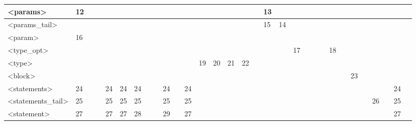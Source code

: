 \begin{tabular}{|l|l|l|l|l|l|l|l|l|l|l|l|l|l|l|l|l|l|l|l|l|l|l|l|l|l|l|l|l|l|l|}
\rowcolor[HTML]{EEEEEE} 
\textless{}params\textgreater{}           & 12 &        &     &     &     &    &      &      &       &    &        &     &        &        &      &   & 13 &    &    &    &   &   &    &   &         &        &        &     &      &    \\ \hline
\textless{}params\_tail\textgreater{}     &    &        &     &     &     &    &      &      &       &    &        &     &        &        &      &   & 15 & 14 &    &    &   &   &    &   &         &        &        &     &      &    \\ \hline
\rowcolor[HTML]{EEEEEE} 
\textless{}param\textgreater{}            & 16 &        &     &     &     &    &      &      &       &    &        &     &        &        &      &   &    &    &    &    &   &   &    &   &         &        &        &     &      &    \\ \hline
\textless{}type\_opt\textgreater{}        &    &        &     &     &     &    &      &      &       &    &        &     &        &        &      &   &    &    & 17 &    &   &   & 18 &   &         &        &        &     &      &    \\ \hline
\rowcolor[HTML]{EEEEEE} 
\textless{}type\textgreater{}             &    &        &     &     &     &    &      &      &       &    &        & 19  & 20     & 21     & 22   &   &    &    &    &    &   &   &    &   &         &        &        &     &      &    \\ \hline
\textless{}block\textgreater{}            &    &        &     &     &     &    &      &      &       &    &        &     &        &        &      &   &    &    &    &    &   &   &    &   & 23      &        &        &     &      &    \\ \hline
\rowcolor[HTML]{EEEEEE} 
\textless{}statements\textgreater{}       & 24 &        &     & 24  & 24  & 24 &      &      & 24    &    & 24     &     &        &        &      &   &    &    &    &    &   &   &    &   &         &        &        &     & 24   &    \\ \hline
\textless{}statements\_tail\textgreater{} & 25 &        &     & 25  & 25  & 25 &      &      & 25    &    & 25     &     &        &        &      &   &    &    &    &    &   &   &    &   &         &        & 26     &     & 25   &    \\ \hline
\rowcolor[HTML]{EEEEEE} 
\textless{}statement\textgreater{}        & 27 &        &     & 27  & 27  & 28 &      &      & 29    &    & 27     &     &        &        &      &   &    &    &    &    &   &   &    &   &         &        &        &     & 27   &    \\ \hline

\end{tabular}
